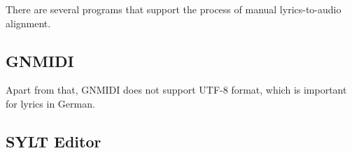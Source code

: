 There are several programs that support the process of manual lyrics-to-audio alignment.

\subsection{GNMIDI}





Apart from that, GNMIDI does not support UTF-8 format, which is important for lyrics in German.

\subsection{SYLT Editor}

